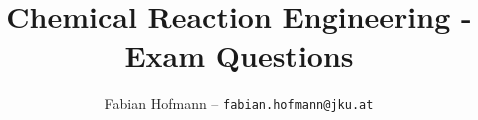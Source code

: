 \documentclass[12pt]{article}
\title{Chemical Reaction Engineering - Exam Questions}
\author{Fabian Hofmann -- \texttt{fabian.hofmann@jku.at}}
\newcounter{question}[question]
\begin{document}
\newcommand{\pySI}[2]{\py{'\\SI{' + str(#1) + '}{#2}'}}
\newcommand{\pyNum}[1]{\py{'\\num{' + str(#1) + '}'}}
\newcommand{\pySIsci}[2]{\py{'\\SI[scientific-notation=true]{' + str(#1) + '}{#2}'}}


\pagestyle{plain}
\maketitle
















\end{document}
